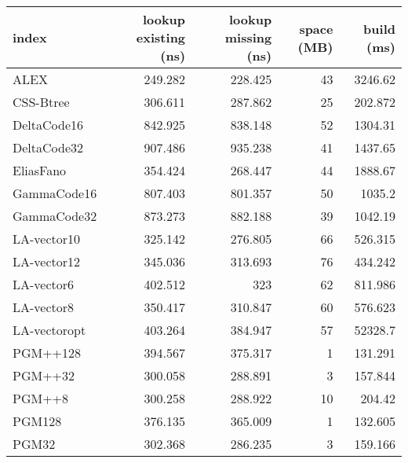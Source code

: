 \begin{tabular}{lrrrr}
\hline
 index             &   lookup existing (ns) &   lookup missing (ns) &   space (MB) &      build (ms) \\
\hline
 ALEX              &                249.282 &               228.425 &           43 &  3246.62        \\
 CSS-Btree         &                306.611 &               287.862 &           25 &   202.872       \\
 DeltaCode16       &                842.925 &               838.148 &           52 &  1304.31        \\
 DeltaCode32       &                907.486 &               935.238 &           41 &  1437.65        \\
 EliasFano         &                354.424 &               268.447 &           44 &  1888.67        \\
 GammaCode16       &                807.403 &               801.357 &           50 &  1035.2         \\
 GammaCode32       &                873.273 &               882.188 &           39 &  1042.19        \\
 LA-vector10       &                325.142 &               276.805 &           66 &   526.315       \\
 LA-vector12       &                345.036 &               313.693 &           76 &   434.242       \\
 LA-vector6        &                402.512 &               323     &           62 &   811.986       \\
 LA-vector8        &                350.417 &               310.847 &           60 &   576.623       \\
 LA-vectoropt      &                403.264 &               384.947 &           57 & 52328.7         \\
 PGM++128          &                394.567 &               375.317 &            1 &   131.291       \\
 PGM++32           &                300.058 &               288.891 &            3 &   157.844       \\
 PGM++8            &                300.258 &               288.922 &           10 &   204.42        \\
 PGM128            &                376.135 &               365.009 &            1 &   132.605       \\
 PGM32             &                302.368 &               286.235 &            3 &   159.166       \\

\end{tabular}
